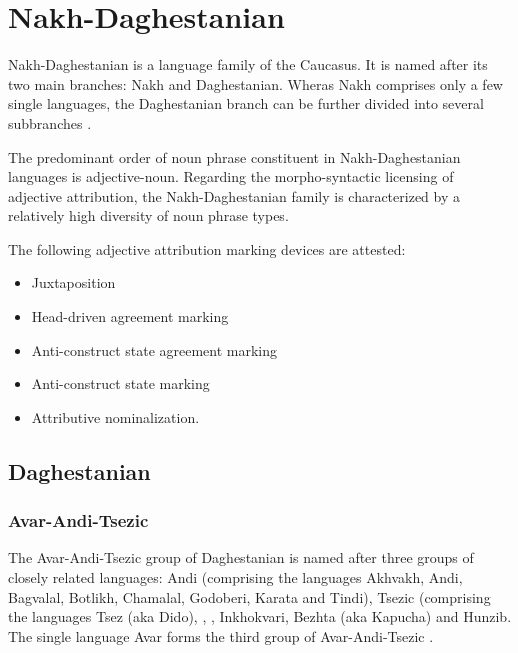 \section{Nakh-Daghestanian}
Nakh-Daghestanian is a language family of the Caucasus. It is named after its two main branches: Nakh and Daghestanian. Wheras Nakh comprises only a few single languages, the Daghestanian branch can be further divided into several subbranches \cite[220, 233]{salminen2007}.

The predominant order of noun phrase constituent in Nakh-Daghestanian languages is adjective-noun. Regarding the morpho-syntactic licensing of adjective attribution, the Nakh-Daghestanian family is characterized by a relatively high diversity of noun phrase types.

The following adjective attribution marking devices are attested:
\begin{itemize}
\item Juxtaposition
\item Head\hyp{}driven agreement marking
\item Anti\hyp{}construct state agreement marking
\item Anti\hyp{}construct state marking
\item Attributive nominalization.
\end{itemize}

\subsection{Daghestanian}
\subsubsection{Avar-Andi-Tsezic}
The Avar-Andi-Tsezic group of Daghestanian is named after three groups of closely related languages: Andi (comprising the languages Akhvakh, Andi, Bagvalal, Botlikh, Chamalal, Godoberi, Karata and Tindi), Tsezic (comprising the languages Tsez (aka Dido), , , Inkhokvari, Bezhta (aka Kapucha) and Hunzib. The single language Avar forms the third group of Avar-Andi-Tsezic \citep[220, 233]{salminen2007}.

